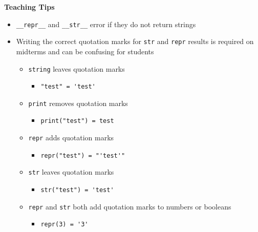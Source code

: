 \begin{blocksection}
\begin{guide}
\textbf{Teaching Tips}
\begin{itemize}
\item \lstinline{__repr__} and \lstinline{__str__} error if they do not return strings
\item Writing the correct quotation marks for \lstinline{str} and \lstinline{repr} results is required on midterms and can be confusing for students
\begin{itemize}
  \item \lstinline{string} leaves quotation marks
  \begin{itemize}
    \item \lstinline{"test" = 'test'}
  \end{itemize}
  \item \lstinline{print} removes quotation marks
  \begin{itemize}
    \item \lstinline{print("test") = test}
  \end{itemize}
  \item \lstinline{repr} adds quotation marks
  \begin{itemize}
    \item \lstinline{repr("test") = "'test'"}
  \end{itemize}
  \item \lstinline{str} leaves quotation marks
  \begin{itemize}
    \item \lstinline{str("test") = 'test'}
  \end{itemize}
  \item \lstinline{repr} and \lstinline{str} both add quotation marks to numbers or booleans
  \begin{itemize}
    \item \lstinline{repr(3) = '3'}
  \end{itemize}
\end{itemize}
\end{itemize}
\end{guide}
\end{blocksection}
